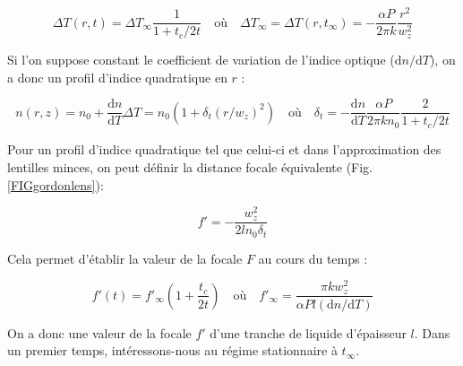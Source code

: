 $$
\Delta T(r,t) = \Delta T_\infty \frac{1}{1+t_c/2t}
\quad \text{où} \quad
\Delta T_\infty = \Delta T(r,t_\infty) = -\frac{\alpha P}{2\pi k}\frac{r^2}{w_z^2}
$$


Si l'on suppose constant le coefficient de variation de l'indice optique ($\mathrm{d}n/\mathrm{d}T$), on a donc un profil d'indice quadratique en $r$ :

$$
n(r,z) = n_0 + \frac{\mathrm{d}n}{\mathrm{d}T}\Delta T = n_0 \left( 1+ \delta_t (r/w_z)^2 \right)
\quad \text{où} \quad
\delta_t = - \frac{\mathrm{d}n}{\mathrm{d}T} \frac{\alpha P}{2\pi kn_0} \frac{2}{1+t_c/2t}
$$

Pour un profil d'indice quadratique tel que celui-ci et dans l'approximation des lentilles minces, on peut définir la distance focale équivalente (Fig. \ref{FIGgordonlens}):

$$
f' = -\frac{w^2_z}{2ln_0\delta_t}
$$

Cela permet d'établir la valeur de la focale $F$ au cours du temps :

$$
f'(t) = f'_\infty \left( 1 + \frac{t_c}{2t} \right) \quad
\text{où} \quad f'_\infty = \frac{\pi k w_z^2}{\alpha Pl(\mathrm{d}n/\mathrm{d}T)}
$$

On a donc une valeur de la focale $f'$ d'une tranche de liquide d'épaisseur $l$. Dans un premier temps, intéressons-nous au régime stationnaire à $t_\infty$.

